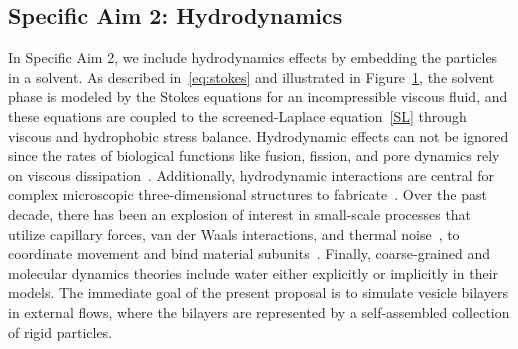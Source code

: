 \subsection{Specific Aim 2: Hydrodynamics}
\label{subsec:specific_aim_2}
In Specific Aim 2, we include hydrodynamics effects by embedding the
particles in a solvent.  As described in~\eqref{eq:stokes} and
illustrated in Figure~\ref{fig:flow_map}, the solvent phase is modeled
by the Stokes equations for an incompressible viscous fluid, and these
equations are coupled to the screened-Laplace equation~\eqref{SL}
through viscous and hydrophobic stress balance. Hydrodynamic effects can
not be ignored since the rates of biological functions like fusion,
fission, and pore dynamics rely on viscous
dissipation~\cite{RYHAM20112929}. 
Additionally, hydrodynamic interactions are central for complex
microscopic three-dimensional structures to fabricate~\cite{Cho2010}.
Over the past decade, there has been an explosion of interest in
small-scale processes that utilize capillary forces, van der Waals
interactions, and thermal noise~\cite{Zhang2017}, to coordinate movement
and bind material subunits~\cite{Pandey2011, Leong2007, Reynolds2019,
Dasgupta2017, Siontorou2017}. Finally, coarse-grained and molecular
dynamics theories include water either explicitly or implicitly in their
models. The immediate goal of the present proposal is to simulate
vesicle bilayers in external flows, where the bilayers are represented
by a self-assembled collection of rigid particles.

\begin{figure}
    \caption{\label{fig:flow_map} }
\end{figure}


